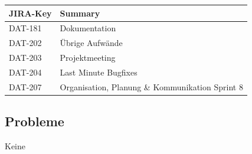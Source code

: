 \begin{table}[H]	
\centering
\begin{tabular}{ll}
\toprule
\textbf{JIRA-Key} & \textbf{Summary}\\
\midrule
DAT-181 & Dokumentation\\
DAT-202 & Übrige Aufwände\\
DAT-203 & Projektmeeting\\
DAT-204 & Last Minute Bugfixes\\
DAT-207 & Organisation, Planung \& Kommunikation Sprint 8\\
\bottomrule
\end{tabular}	
\end{table}

\subsection*{Probleme}
Keine